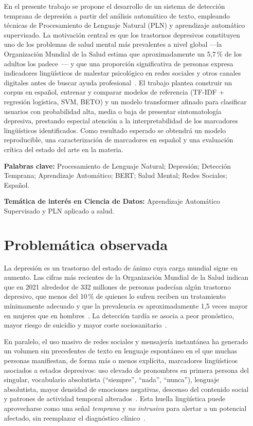 \documentclass[12pt,a4paper,spanish]{article}
\begin{document}
En el presente trabajo se propone el desarrollo de un sistema de detección temprana de depresión a partir del análisis automático de texto, empleando técnicas de Procesamiento de Lenguaje Natural (PLN) y aprendizaje automático supervisado. La motivación central es que los trastornos depresivos constituyen uno de los problemas de salud mental más prevalentes a nivel global —la Organización Mundial de la Salud estima que aproximadamente un 5{,}7\,\% de los adultos los padece~\cite{who2025depression}— y que una proporción significativa de personas expresa indicadores lingüísticos de malestar psicológico en redes sociales y otros canales digitales antes de buscar ayuda profesional~\cite{nature2026review,pmc11574504}. El trabajo plantea construir un corpus en español, entrenar y comparar modelos de referencia (TF-IDF + regresión logística, SVM, BETO) y un modelo transformer afinado para clasificar usuarios con probabilidad alta, media o baja de presentar sintomatología depresiva, prestando especial atención a la interpretabilidad de los marcadores lingüísticos identificados. Como resultado esperado se obtendrá un modelo reproducible, una caracterización de marcadores en español y una evaluación crítica del estado del arte en la materia.

\textbf{Palabras clave:} Procesamiento de Lenguaje Natural; Depresión; Detección Temprana; Aprendizaje Automático; BERT; Salud Mental; Redes Sociales; Español.

\textbf{Temática de interés en Ciencia de Datos:} Aprendizaje Automático Supervisado y PLN aplicado a salud.

\section{Problemática observada}

La depresión es un trastorno del estado de ánimo cuya carga mundial sigue en aumento. Las cifras más recientes de la Organización Mundial de la Salud indican que en 2021 alrededor de 332 millones de personas padecían algún trastorno depresivo, que menos del 10\,\% de quienes lo sufren reciben un tratamiento mínimamente adecuado y que la prevalencia es aproximadamente 1{,}5 veces mayor en mujeres que en hombres~\cite{who2025depression,who2025mentalhealth}. La detección tardía se asocia a peor pronóstico, mayor riesgo de suicidio y mayor coste sociosanitario~\cite{jmir2019spanish}.

En paralelo, el uso masivo de redes sociales y mensajería instantánea ha generado un volumen sin precedentes de texto en lenguaje espontáneo en el que muchas personas manifiestan, de forma más o menos explícita, marcadores lingüísticos asociados a estados depresivos: uso elevado de pronombres en primera persona del singular, vocabulario absolutista (``siempre'', ``nada'', ``nunca''), lenguaje absolutista, mayor densidad de emociones negativas, descenso del contenido social y patrones de actividad temporal alterados~\cite{aisel2023mentalbert,jmir2019spanish,pmc8993841,frontiers2025xai}. Esta huella lingüística puede aprovecharse como una señal \emph{temprana} y \emph{no intrusiva} para alertar a un potencial afectado, sin reemplazar el diagnóstico clínico~\cite{leis2019tesis}.
\end{document}
